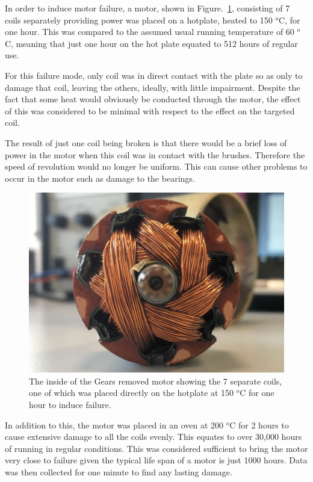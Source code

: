 
In order to induce motor failure, a motor, shown in Figure.~\ref{fig:hotplate_motor}, consisting of 7 coils separately providing power was placed on a hotplate, heated to 150 $^o$C, for one hour. This was compared to the assumed usual running temperature of 60 $^o$C, meaning that just one hour on the hot plate equated to 512 hours of regular use.

For this failure mode, only coil was in direct contact with the plate so as only to damage that coil, leaving the others, ideally, with little impairment. Despite the fact that some heat would obviously be conducted through the motor, the effect of this was considered to be minimal with respect to the effect on the targeted coil.

The result of just one coil being broken is that there would be a brief loss of power in the motor when this coil was in contact with the brushes.
Therefore the speed of revolution would no longer be uniform. This can cause other problems to occur in the motor such as damage to the bearings.

\begin{figure}[t]
    \includegraphics[width=1.0\textwidth]{fig/Gears_Removed_Inside.JPG}
    \caption[Motor Placed on Hotplate]{The inside of the Gears removed motor showing the 7 separate coils, one of which was placed directly on the hotplate at 150 $^o$C for one hour to induce failure.}
    \label{fig:hotplate_motor}
\end{figure}

In addition to this, the motor was placed in an oven at 200 $^o$C for 2 hours to cause extensive damage to all the coils evenly. This equates to over 30,000 hours of running in regular conditions. This was considered sufficient to bring the motor very close to failure given the typical life span of a motor is just 1000 hours. %
Data was then collected for one minute to find any lasting damage.

